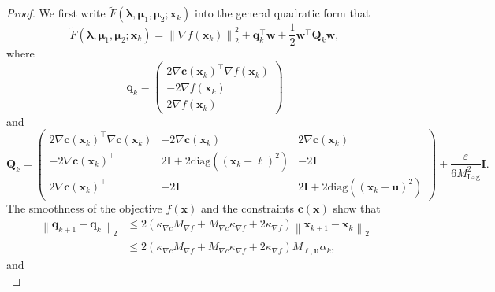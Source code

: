\documentclass[aos]{imsart}
\numberwithin{equation}{section}
\theoremstyle{plain}
\begin{document}
\begin{appendix}
\begin{proof}
    We first write $\widetilde{F}(\bm{\lambda}, \bm{\mu}_{1}, \bm{\mu}_2; \bm{x}_k)$ into the general quadratic form that
    \begin{equation*}
        \widetilde{F}(\bm{\lambda}, \bm{\mu}_{1}, \bm{\mu}_2; \bm{x}_{k}) = \left\| \nabla f(\bm{x}_{k}) \right\|_2^2 +  \bm{q}_{k}^{\top} \bm{w} + \frac{1}{2} \bm{w}^{\top} \bm{Q}_{k} \bm{w},
    \end{equation*}
    where
    \begin{equation*}
        \bm{q}_{k} = \left( \begin{array}{c}
             2 \nabla \bm{c}(\bm{x}_{k})^{\top} \nabla f(\bm{x}_{k})   \\
             -2  \nabla f(\bm{x}_{k}) \\
             2 \nabla f(\bm{x}_{k}) 
        \end{array} \right)
    \end{equation*}
    and
    \begin{equation*}
        \bm{Q}_{k} = \left( \begin{array}{ccc}
            2 \nabla \bm{c}(\bm{x}_{k})^{\top} \nabla \bm{c}(\bm{x}_{k})  & -2 \nabla \bm{c}(\bm{x}_{k}) & 2 \nabla \bm{c}(\bm{x}_{k}) \\
            -2 \nabla \bm{c}(\bm{x}_{k})^{\top} & 2 \bm{I} + 2 \text{diag}\left( \left( \bm{x}_{k} - \bm{\ell} \right)^2 \right) & -2 \bm{I} \\
            2 \nabla \bm{c}(\bm{x}_{k})^{\top} & -2 \bm{I} & 2 \bm{I} + 2 \text{diag}\left( \left( \bm{x}_{k} - \bm{u} \right)^2 \right) 
        \end{array} \right) + \frac{\varepsilon}{6 M_{\text{Lag}}^2 } \bm{I}.
    \end{equation*}
    The smoothness of the objective $f(\bm{x})$ and the constraints $\bm{c}(\bm{x})$ show that
    \begin{equation}
    \label{eq20}
        \begin{split}
            \left\| \bm{q}_{k+1} - \bm{q}_{k} \right\|_2 & \leq 2 \left( \kappa_{\nabla c} M_{\nabla f} + M_{\nabla c} \kappa_{\nabla f} + 2 \kappa_{\nabla f} \right) \left\| \bm{x}_{k+1} - \bm{x}_{k} \right\|_2 \\
            & \leq  2 \left( \kappa_{\nabla c} M_{\nabla f} + M_{\nabla c} \kappa_{\nabla f} + 2 \kappa_{\nabla f} \right) M_{\bm{\ell},\bm{u}} \alpha_k,
        \end{split}
    \end{equation}
    and
    \begin{equation}

\end{equation}
\end{proof}
\end{appendix}
\end{document}
